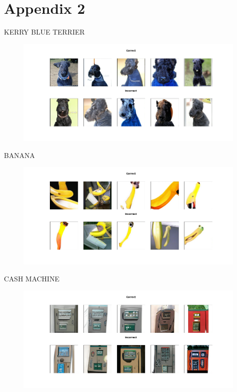 \documentclass[11pt,a4paper,openany]{book}
\begin{document}
\chapter{Appendix 2}
\noindent KERRY BLUE TERRIER
\begin{figure}[h!]
    \centering
    \includegraphics[scale=0.4]{figs/imagenet_examples/Kerry blue terrier.png}
\end{figure}
\newline
BANANA
\begin{figure}[h!]
    \centering
    \includegraphics[scale=0.4]{figs/imagenet_examples/banana.png}
\end{figure}
\newpage
\noindent CASH MACHINE
\begin{figure}[h!]
    \centering
    \includegraphics[scale=0.4]{figs/imagenet_examples/cash machine.png}
\end{figure}
\end{document}
